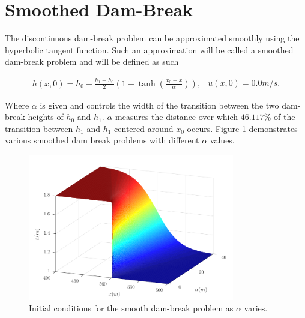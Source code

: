 \documentclass[SingleSpace,12pt,Proceedings]{Serre_ASCE}
\begin{document}
\section{Smoothed Dam-Break}
\label{section:smootheddambreak}
The discontinuous dam-break problem can be approximated smoothly using the hyperbolic tangent function. Such an approximation will be called a smoothed dam-break problem and will be defined as such
\begin{linenomath*}
\begin{subequations}
\begin{gather}
h(x,0) = h_0 + \frac{h_1 - h_0}{2}\left(1 + \tanh\left(\frac{x_0 - x}{\alpha}\right)\right),
\end{gather}
\begin{gather}
u(x,0) = 0.0m/s.
\end{gather}
\end{subequations}
\label{eq:sdbi}
\end{linenomath*}
Where $\alpha$ is given and controls the width of the transition between the two dam-break heights of $h_0$ and $h_1$. $\alpha$ measures the distance over which $46.117\%$ of the transition between $h_1$ and $h_1$ centered around $x_0$ occurs. Figure \ref{fig:dbsmoothinit} demonstrates various smoothed dam break problems with different $\alpha$ values.
\begin{figure}
\centering
\includegraphics[width=9cm]{pics/explainers/dbs.pdf}
\caption{Initial conditions for the smooth dam-break problem as $\alpha$ varies.}
\label{fig:dbsmoothinit}
\end{figure}
%
\end{document}
